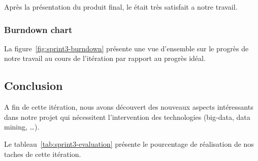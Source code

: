 Après la présentation du produit final, le  était très satisfait
a notre travail.

\subsubsection{Burndown chart}

La figure~\ref{fig:sprint3-burndown} présente une vue d'ensemble sur le progrès
de notre travail au cours de l'itération par rapport au progrès idéal.



\subsection*{Conclusion}

A fin de cette itération, nous avons découvert des nouveaux aspects intéressants dans notre projet
qui nécessitent l'intervention des technologies (big-data, data mining, \ldots).

Le tableau~\ref{tab:sprint3-evaluation} présente le pourcentage de
réalisation de nos taches de cette itération.

